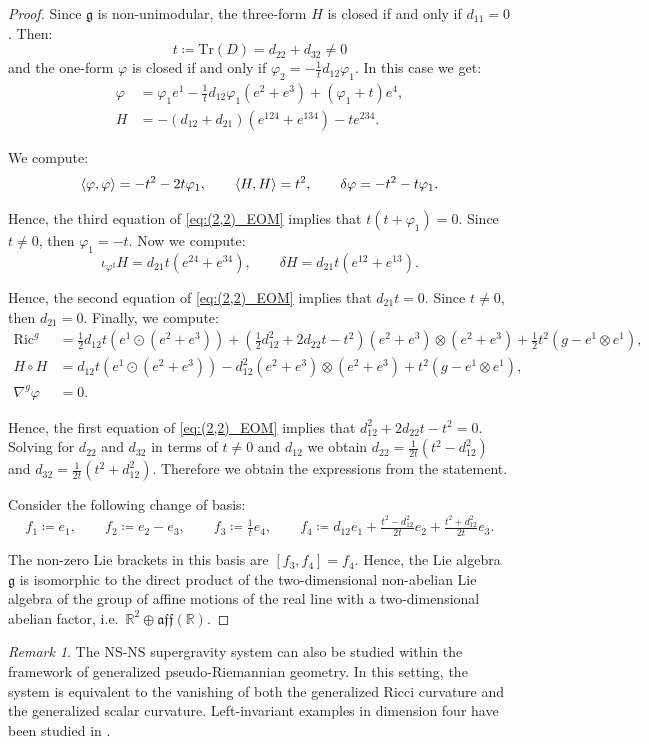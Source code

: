 \documentclass[10pt,reqno]{amsart}
\theoremstyle{definition}
\theoremstyle{remark}
\newtheorem{remark}[theorem]{Remark}
\newcommand{\R}{\mathbb{R}}
\newcommand{\Tr}{\mathrm{Tr}}
\DeclarePairedDelimiter{\escal}{\langle}{\rangle}
\begin{document}
\begin{proof}
    Since $\mathfrak{g}$ is non-unimodular, the three-form $H$ is closed if and only if $d_{11}=0$. Then: $$t\coloneqq\Tr(D)=d_{22}+d_{32}\neq0$$ and the one-form $\varphi$ is closed if and only if $\varphi_2=-\tfrac{1}{t}d_{12}\varphi_1$. In this case we get: \begin{align*}
        \varphi&=\varphi_1e^1-\tfrac{1}{t}d_{12}\varphi_1(e^2+e^3)+(\varphi_1+t)e^4,\\
        H&=-(d_{12}+d_{21})(e^{124}+e^{134})-te^{234}.
    \end{align*}

    We compute: $$\escal{\varphi,\varphi}=-t^2-2t\varphi_1,\qquad\escal{H,H}=t^2,\qquad\delta\varphi=-t^2-t\varphi_1.$$

    Hence, the third equation of \eqref{eq:(2,2)_EOM} implies that $t(t+\varphi_1)=0$. Since $t\neq0$, then $\varphi_1=-t$. Now we compute: $$\iota_{\varphi^\sharp}H=d_{21}t(e^{24}+e^{34}),\qquad \delta H=d_{21}t(e^{12}+e^{13}).$$

    Hence, the second equation of \eqref{eq:(2,2)_EOM} implies that $d_{21}t=0$. Since $t\neq0$, then $d_{21}=0$. Finally, we compute: \begin{align*}
        \mathrm{Ric}^g&=\tfrac{1}{2}d_{12}t(e^1\odot(e^2+e^3))+(\tfrac{1}{2}d_{12}^2+2d_{22}t-t^2)(e^2+e^3)\otimes(e^2+e^3)+\tfrac{1}{2}t^2(g-e^1\otimes e^1),\\
        H\circ H&=d_{12}t(e^1\odot(e^2+e^3))-d_{12}^2(e^2+e^3)\otimes(e^2+e^3)+t^2(g-e^1\otimes e^1),\\
        \nabla^g\varphi&=0.
    \end{align*}

    Hence, the first equation of \eqref{eq:(2,2)_EOM} implies that $d_{12}^2+2d_{22}t-t^2=0$. Solving for $d_{22}$ and $d_{32}$ in terms of $t\neq0$ and $d_{12}$ we obtain $d_{22}=\frac{1}{2t}(t^2-d_{12}^2)$ and $d_{32}=\frac{1}{2t}(t^2+d_{12}^2)$. Therefore we obtain the expressions from the statement.\medskip
    
    Consider the following change of basis: $$f_1\coloneqq e_1,\qquad f_2\coloneqq e_2-e_3,\qquad f_3\coloneqq\tfrac{1}{t}e_4,\qquad f_4\coloneqq d_{12}e_1+\tfrac{t^2-d_{12}^2}{2t}e_2+\tfrac{t^2+d_{12}^2}{2t}e_3.$$

    The non-zero Lie brackets in this basis are $[f_3,f_4]=f_4$. Hence, the Lie algebra $\mathfrak{g}$ is isomorphic to the direct product of the two-dimensional non-abelian Lie algebra of the group of affine motions of the real line with a two-dimensional abelian factor, i.e.\ $\R^2\oplus\mathfrak{aff}(\R)$.
\end{proof}

\begin{remark}
    The NS-NS supergravity system can also be studied within the framework of generalized pseudo-Riemannian geometry. In this setting, the system is equivalent to the vanishing of both the generalized Ricci curvature and the generalized scalar curvature. Left-invariant examples in dimension four have been studied in \cite{Cortes_Freibert_Galdeano2024}.
\end{remark}




\end{document}
